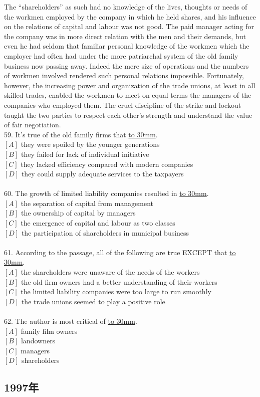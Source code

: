 \documentclass[a4paper]{article}
\begin{document}
\par
The “shareholders” as such had no knowledge of the lives, thoughts or needs of the workmen employed by the company in which he held shares, and his influence on the relations of capital and labour was not good. The paid manager acting for the company was in more direct relation with the men and their demands, but even he had seldom that familiar personal knowledge of the workmen which the employer had often had under the more patriarchal system of the old family business now passing away. Indeed the mere size of operations and the numbers of workmen involved rendered such personal relations impossible. Fortunately, however, the increasing power and organization of the trade unions, at least in all skilled trades, enabled the workmen to meet on equal terms the managers of the companies who employed them. The cruel discipline of the strike and lockout taught the two parties to respect each other’s strength and understand the value of fair negotiation.
\\59.	It’s true of the old family firms that \underline{\hbox to 30mm{}}.\\$[A]$ they were spoiled by the younger generations\\$[B]$ they failed for lack of individual initiative\\$[C]$ they lacked efficiency compared with modern companies\\$[D]$ they could supply adequate services to the taxpayers\\\\60.	The growth of limited liability companies resulted in \underline{\hbox to 30mm{}}.\\$[A]$ the separation of capital from management\\$[B]$ the ownership of capital by managers\\$[C]$ the emergence of capital and labour as two classes\\$[D]$ the participation of shareholders in municipal business\\\\61.	According to the passage, all of the following are true EXCEPT that \underline{\hbox to 30mm{}}.\\$[A]$ the shareholders were unaware of the needs of the workers\\$[B]$ the old firm owners had a better understanding of their workers\\$[C]$ the limited liability companies were too large to run smoothly\\$[D]$ the trade unions seemed to play a positive role\\\\62.	The author is most critical of \underline{\hbox to 30mm{}}.\\$[A]$ family film owners\\$[B]$ landowners\\$[C]$ managers\\$[D]$ shareholders\\\subsection{1997年}
\end{document}
